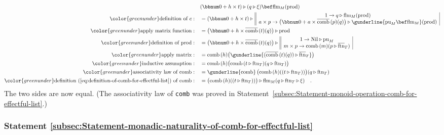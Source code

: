 \begin{align*}
 & (\bbnum 0+h\times t)\triangleright(q\triangleright\xi)\bef\text{flm}_{M}(\text{prod})\\
{\color{greenunder}\text{definition of }c:}\quad & =(\bbnum 0+h\times t)\triangleright\,\begin{array}{||c|}
1\rightarrow q\triangleright\text{flm}_{M}(\text{prod})\\
a\times p\rightarrow\big(\bbnum 0+a\times\overline{\text{comb}}\,(p)(q)\big)\triangleright\gunderline{\text{pu}_{M}\bef\text{flm}_{M}}(\text{prod})
\end{array}\\
{\color{greenunder}\text{apply matrix function}:}\quad & =\big(\bbnum 0+h\times\overline{\text{comb}}\,(t)(q)\big)\triangleright\text{prod}\\
{\color{greenunder}\text{definition of }\text{prod}:}\quad & =\big(\bbnum 0+h\times\overline{\text{comb}}\,(t)(q)\big)\triangleright\,\begin{array}{||c|}
1\rightarrow\text{Nil}\triangleright\text{pu}_{M}\\
m\times p\rightarrow\text{comb}\,(m)(p\triangleright\overline{\text{ftn}}_{T})
\end{array}\\
{\color{greenunder}\text{apply matrix}:}\quad & =\text{comb}\,(h)\big(\gunderline{(\overline{\text{comb}}\,(t)(q))\triangleright\overline{\text{ftn}}_{T}}\big)\\
{\color{greenunder}\text{inductive assumption}:}\quad & =\text{comb}\,(h)\big(\text{comb}\,(t\triangleright\text{ftn}_{T})(q\triangleright\text{ftn}_{T})\big)\\
{\color{greenunder}\text{associativity law of }\text{comb}:}\quad & =\gunderline{\text{comb}}\,\big(\text{comb}\,(h)((t\triangleright\text{ftn}_{T}))\big)(q\triangleright\text{ftn}_{T})\\
{\color{greenunder}\text{definition~(\ref{eq:definition-of-comb-for-effectful-list}) of }\text{comb}:}\quad & =\big(\text{comb}\,(h)((t\triangleright\text{ftn}_{T}))\big)\triangleright\text{flm}_{M}(q\triangleright\text{ftn}_{T}\triangleright\xi)\quad.
\end{align*}
The two sides are now equal. (The associativity law of \lstinline!comb!
was proved in Statement~\ref{subsec:Statement-monoid-operation-comb-for-effectful-list}.)

\subsubsection{Statement \label{subsec:Statement-monadic-naturality-of-comb-for-effectful-list}\ref{subsec:Statement-monadic-naturality-of-comb-for-effectful-list}}

